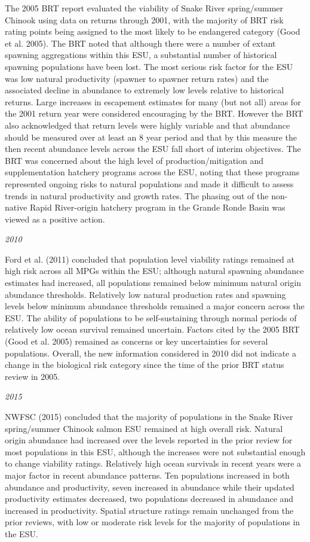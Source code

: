 \documentclass[
  letterpaper,
  oneside,
  open=any]{scrbook}
\begin{document}
The 2005 BRT report evaluated the viability of Snake River spring/summer
Chinook using data on returns through 2001, with the majority of BRT
risk rating points being assigned to the most likely to be endangered
category (Good et al. 2005). The BRT noted that although there were a
number of extant spawning aggregations within this ESU, a substantial
number of historical spawning populations have been lost. The most
serious risk factor for the ESU was low natural productivity (spawner to
spawner return rates) and the associated decline in abundance to
extremely low levels relative to historical returns. Large increases in
escapement estimates for many (but not all) areas for the 2001 return
year were considered encouraging by the BRT. However the BRT also
acknowledged that return levels were highly variable and that abundance
should be measured over at least an 8 year period and that by this
measure the then recent abundance levels across the ESU fall short of
interim objectives. The BRT was concerned about the high level of
production/mitigation and supplementation hatchery programs across the
ESU, noting that these programs represented ongoing risks to natural
populations and made it difficult to assess trends in natural
productivity and growth rates. The phasing out of the non-native Rapid
River-origin hatchery program in the Grande Ronde Basin was viewed as a
positive action.

\emph{2010}

Ford et al. (2011) concluded that population level viability ratings
remained at high risk across all MPGs within the ESU; although natural
spawning abundance estimates had increased, all populations remained
below minimum natural origin abundance thresholds. Relatively low
natural production rates and spawning levels below minimum abundance
thresholds remained a major concern across the ESU. The ability of
populations to be self-sustaining through normal periods of relatively
low ocean survival remained uncertain. Factors cited by the 2005 BRT
(Good et al. 2005) remained as concerns or key uncertainties for several
populations. Overall, the new information considered in 2010 did not
indicate a change in the biological risk category since the time of the
prior BRT status review in 2005.

\emph{2015}

NWFSC (2015) concluded that the majority of populations in the Snake
River spring/summer Chinook salmon ESU remained at high overall risk.
Natural origin abundance had increased over the levels reported in the
prior review for most populations in this ESU, although the increases
were not substantial enough to change viability ratings. Relatively high
ocean survivals in recent years were a major factor in recent abundance
patterns. Ten populations increased in both abundance and productivity,
seven increased in abundance while their updated productivity estimates
decreased, two populations decreased in abundance and increased in
productivity. Spatial structure ratings remain unchanged from the prior
reviews, with low or moderate risk levels for the majority of
populations in the ESU.
\end{document}
